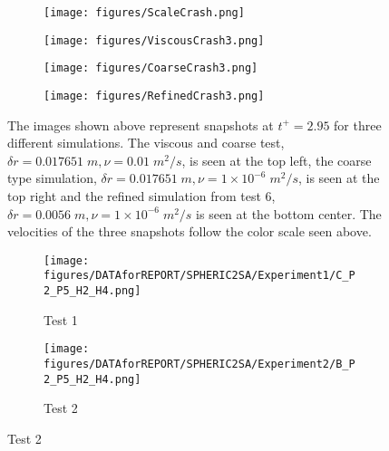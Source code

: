 \documentclass{../GPUSPHtemplate}
\begin{document}
\begin{figure}[H]

	\begin{subfigure}[b]{0.7\linewidth}
	 \centering
	\hspace*{3.3cm} \texttt{[image: figures/ScaleCrash.png]}
	 \end{subfigure}	
	
  \begin{subfigure}[b]{0.75\linewidth}
    \centering
     \hspace*{-5cm} \texttt{[image: figures/ViscousCrash3.png]} 
  \end{subfigure}%
  \begin{subfigure}[b]{0.75\linewidth}
    \centering
    \hspace*{-10cm} \texttt{[image: figures/CoarseCrash3.png]} 
  \end{subfigure} 
	\vspace*{2pt}
	
	\begin{subfigure}[b]{1\linewidth}
	\centering
	\texttt{[image: figures/RefinedCrash3.png]}
	\end{subfigure}
	
	\caption{The images shown above represent snapshots at $t^+ = 2.95 $ for three different simulations. The viscous and coarse test, $\delta r = 0.017651 \; m, \nu = 0.01 \; m^2/s$, is seen at the top left, the coarse type simulation, $\delta r = 0.017651 \; m, \nu = 1 \times 10^{-6} \; m^2/s$, is seen at the top right and the refined simulation from test 6, $\delta r = 0.0056 \; m, \nu = 1 \times 10^{-6} \; m^2/s$ is seen at the bottom center. The velocities of the three snapshots follow the color scale  seen above.}
	\label{fig:Crash}
\end{figure}

\begin{figure}[H]
  	 \centering 	
	 \begin{subfigure}[b]{1\linewidth}
	    \texttt{[image: figures/DATAforREPORT/SPHERIC2SA/Experiment1/C\_P2\_P5\_H2\_H4.png]} 
	    \caption{Test 1}
	 \end{subfigure}%
  
  	 \begin{subfigure}[b]{1\linewidth}
    		\texttt{[image: figures/DATAforREPORT/SPHERIC2SA/Experiment2/B\_P2\_P5\_H2\_H4.png]} 		
		\caption{Test 2}
 	 \end{subfigure}   
\end{figure}
\end{document}
